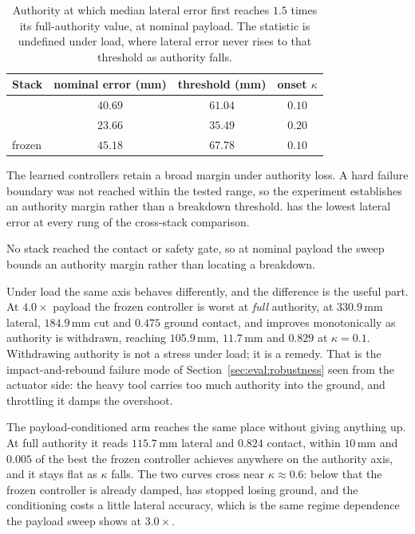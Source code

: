 \begin{table}[tbp]
  \centering
  \caption{Authority at which median lateral error first reaches $1.5$ times
  its full-authority value, at nominal payload. The statistic is undefined under
  load, where lateral error never rises to that threshold as authority falls.}
  \label{tab:eval:kappa}
  \begin{tabular}{lccc}
    \toprule
    Stack & nominal error (mm) & threshold (mm) & onset $\kappa$ \\
    \midrule
    \ppoROM{} & $40.69$ & $61.04$ & $0.10$ \\
    \ppoIDFD{} & $23.66$ & $35.49$ & $0.20$ \\
    \ppoAAMFD{} frozen & $45.18$ & $67.78$ & $0.10$ \\
    \bottomrule
  \end{tabular}
\end{table}

The learned controllers retain a broad margin under authority loss. A hard
failure boundary was not reached within the tested range, so the experiment
establishes an authority margin rather than a breakdown threshold. \ppoIDFD{}
has the lowest lateral error at every rung of the cross-stack comparison.

No stack reached the contact or safety gate, so at nominal payload the sweep
bounds an authority margin rather than locating a breakdown.

Under load the same axis behaves differently, and the difference is the useful
part. At $4.0\times$ payload the frozen controller is worst at \emph{full}
authority, at $330.9$\,mm lateral, $184.9$\,mm cut and $0.475$ ground contact,
and improves monotonically as authority is withdrawn, reaching $105.9$\,mm,
$11.7$\,mm and $0.829$ at $\kappa=0.1$. Withdrawing authority is not a stress
under load; it is a remedy. That is the impact-and-rebound failure mode of
Section~\ref{sec:eval:robustness} seen from the actuator side: the heavy tool
carries too much authority into the ground, and throttling it damps the
overshoot.

The payload-conditioned arm reaches the same place without giving anything up.
At full authority it reads $115.7$\,mm lateral and $0.824$ contact, within
$10$\,mm and $0.005$ of the best the frozen controller achieves anywhere on the
authority axis, and it stays flat as $\kappa$ falls. The two curves cross near
$\kappa \approx 0.6$: below that the frozen controller is already damped, has
stopped losing ground, and the conditioning costs a little lateral accuracy,
which is the same regime dependence the payload sweep shows at $3.0\times$.

